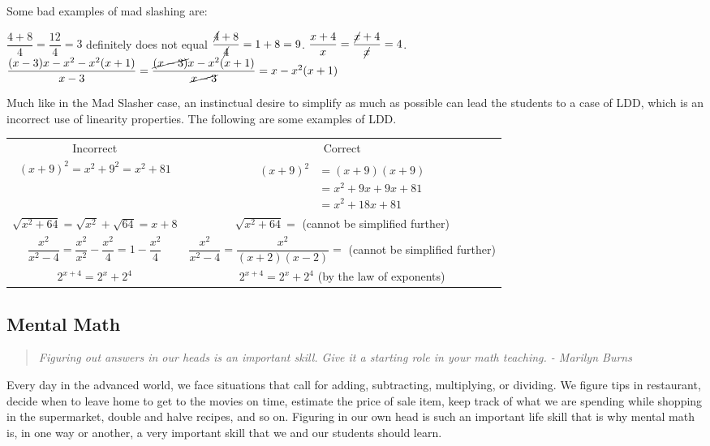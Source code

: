 Some bad examples of mad slashing are:
\begin{example}
\Item $\dfrac{4+8}{4}=\dfrac{12}{4}=3$ definitely does not equal $\dfrac{\cancel{4}+8}{\cancel{4}}=1+8=9$.
\Item $\dfrac{x+4}{x}=\dfrac{\cancel{x}+4}{\cancel{x}}=4$.
\Item $\dfrac{(x-3)x-x^2-x^2(x+1)}{x-3}=\dfrac{\cancel{(x-3)}x-x^2(x+1)}{\cancel{x-3}}=x-x^2(x+1)$
\end{example}
Much like in the Mad Slasher case, an instinctual desire to simplify as much as
possible can lead the students to a case of LDD, which is an incorrect use of linearity
properties. The following are some examples of LDD.
{\setlength{\abovedisplayskip}{-12pt}
\begin{center}
\begin{tabular}[t]{cc}
Incorrect & Correct\\
$(x+9)^2=x^2+9^2=x^2+81$ &
\parbox[t][]{0.3\textwidth}{
\begin{align*}
(x+9)^2&=(x+9)(x+9)\\
			&=x^2+9x+9x+81\\
			&=x^2+18x+81
\end{align*}
}\\
$\sqrt{x^2+64}=\sqrt{x^2}+\sqrt{64}=x+8$ & $\sqrt{x^2+64}=$ (cannot be simplified further)\\
$\dfrac{x^2}{x^2-4}=\dfrac{x^2}{x^2}-\dfrac{x^2}{4}=1-\dfrac{x^2}{4}$ & $\dfrac{x^2}{x^2-4}=\dfrac{x^2}{(x+2)(x-2)}=$ (cannot be simplified further)\\
$2^{x+4}=2^x+2^4$ & $2^{x+4}=2^x+2^4$ (by the law of exponents)\\
\end{tabular}
\end{center}}

\subsection*{Mental Math}
\begin{quote}
\textit{Figuring out answers in our heads is an important skill. Give it a starting role in your math
teaching. - Marilyn Burns}
\end{quote}

Every day in the advanced world, we face situations that call for adding, subtracting,
multiplying, or dividing. We figure tips in restaurant, decide when to leave home to get to the
movies on time, estimate the price of sale item, keep track of what we are spending while shopping
in the supermarket, double and halve recipes, and so on. Figuring in our own head is such an
important life skill that is why mental math is, in one way or another, a very important skill that we
and our students should learn.

